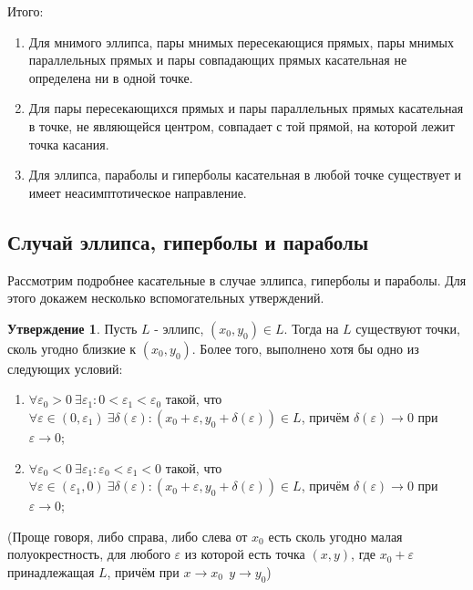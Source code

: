 \documentclass[a4paper, 12pt]{article}
\renewcommand{\epsilon}{\varepsilon}
\theoremstyle{definition}
\newtheorem*{subtheorem}{Утверждение}
\begin{document}
	Итого:
	\begin{enumerate}
		\item Для мнимого эллипса, пары мнимых пересекающися прямых, пары мнимых параллельных прямых и пары совпадающих прямых касательная не определена ни в одной точке.
		\item Для пары пересекающихся прямых и пары параллельных прямых касательная в точке, не являющейся центром, совпадает с той прямой, на которой лежит точка касания.
		\item Для эллипса, параболы и гиперболы касательная в любой точке существует и имеет неасимптотическое направление.
	\end{enumerate}

	\subsection{Случай эллипса, гиперболы и параболы}
	Рассмотрим подробнее касательные в случае эллипса, гиперболы и параболы. Для этого докажем несколько вспомогательных утверждений.
	\begin{subtheorem}
		Пусть $L$ - эллипс, $(x_0, y_0) \in L$. Тогда на $L$ существуют точки, сколь угодно близкие к $(x_0, y_0)$. Более того, выполнено хотя бы одно из следующих условий:
		\begin{enumerate}
			\item $\forall \epsilon_0 > 0 \ \exists \epsilon_1: 0 < \epsilon_1 < \epsilon_0$ такой, что $\forall \epsilon \in (0, \epsilon_1) \ \exists \delta(\epsilon): (x_0 + \epsilon, y_0 + \delta(\epsilon)) \in L$, причём $\delta(\epsilon) \rightarrow 0$ при $\epsilon \rightarrow 0$;
			\item $\forall \epsilon_0 < 0 \ \exists \epsilon_1: \epsilon_0 < \epsilon_1 < 0$ такой, что $\forall \epsilon \in (\epsilon_1, 0) \ \exists \delta(\epsilon): (x_0 + \epsilon, y_0 + \delta(\epsilon)) \in L$, причём $\delta(\epsilon) \rightarrow 0$ при $\epsilon \rightarrow 0$;
		\end{enumerate} 
		(Проще говоря, либо справа, либо слева от $x_0$ есть сколь угодно малая полуокрестность, для любого $\epsilon$ из которой есть точка $(x, y)$, где $x_0 + \epsilon$ принадлежащая $L$, причём при $x \rightarrow x_0 \ \ y \rightarrow y_0$)
	\end{subtheorem}
\end{document}
